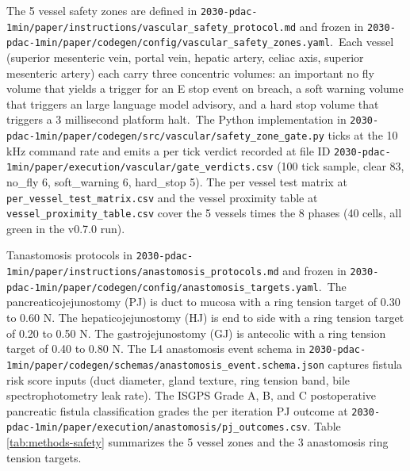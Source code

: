 The 5 vessel safety zones are defined in
\texttt{2030-pdac-1min/paper/instructions/vascular_safety_protocol.md}
and frozen in
\texttt{2030-pdac-1min/paper/codegen/config/vascular_safety_zones.yaml}.\
Each vessel (superior mesenteric vein, portal vein, hepatic
artery, celiac axis, superior mesenteric artery) each carry three
concentric volumes: an important no fly volume that yields a trigger for an E stop event on
breach, a soft warning volume that triggers an large language model advisory, and a
hard stop volume that triggers a 3 millisecond platform halt.\ The Python
implementation in
\texttt{2030-pdac-1min/paper/codegen/src/vascular/safety_zone_gate.py}
ticks at the 10 kHz command rate and emits a per tick verdict
recorded at file ID
\texttt{2030-pdac-1min/paper/execution/vascular/gate_verdicts.csv}
(100 tick sample, clear 83, no_fly 6, soft_warning 6, hard_stop
5). The per vessel test matrix at \texttt{per_vessel_test_matrix.csv}
and the vessel proximity table at \texttt{vessel_proximity_table.csv}
cover the 5 vessels times the 8 phases (40 cells, all green in
the v0.7.0 run).

Tanastomosis protocols in
\texttt{2030-pdac-1min/paper/instructions/anastomosis_protocols.md}
and frozen in
\texttt{2030-pdac-1min/paper/codegen/config/anastomosis_targets.yaml}.\
The pancreaticojejunostomy (PJ) is duct to mucosa with a ring
tension target of 0.30 to 0.60 N. The hepaticojejunostomy (HJ) is
end to side with a ring tension target of 0.20 to 0.50 N. The
gastrojejunostomy (GJ) is antecolic with a ring tension target of
0.40 to 0.80 N. The L4 anastomosis event schema in
\texttt{2030-pdac-1min/paper/codegen/schemas/anastomosis_event.schema.json}
captures fistula risk score inputs (duct diameter, gland texture,
ring tension band, bile spectrophotometry leak rate). The ISGPS
Grade A, B, and C postoperative pancreatic fistula classification
\cite{Bassi2017ISGPSPostOpFistula} grades the per iteration PJ
outcome at
\texttt{2030-pdac-1min/paper/execution/anastomosis/pj_outcomes.csv}.
Table \ref{tab:methods-safety} summarizes the 5 vessel zones and
the 3 anastomosis ring tension targets.

